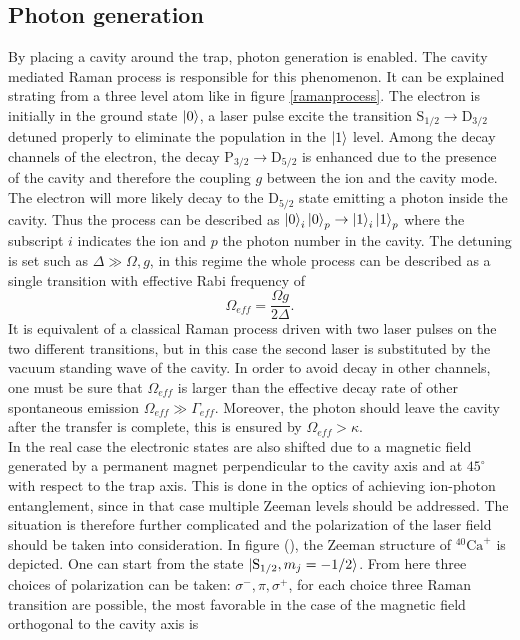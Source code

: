 \subsection{Photon generation}
\label{sec:ramanprocess}
By placing a cavity around the trap, photon generation is enabled. The cavity mediated Raman process is responsible for this phenomenon. It can be explained strating from a three level atom like in figure \ref{ramanprocess}. The electron is initially in the ground state $\ket{0}$, a laser pulse excite the transition $\text{S}_{1/2} \to \text{D}_{3/2}$ detuned properly to eliminate the population in the $\ket{1}$ level. Among the decay channels of the electron, the decay $\text{P}_{3/2} \to \text{D}_{5/2}$ is enhanced due to the presence of the cavity and therefore the coupling $g$ between the ion and the cavity mode. The electron will more likely decay
to the $\text{D}_{5/2}$ state emitting a photon inside the cavity. Thus the process can be described as $\ket{0}_i\ket{0}_p \to \ket{1}_i\ket{1}_p$ where the subscript $i$ indicates the ion and $p$ the photon number in the cavity. The detuning is set such as $\Delta \gg \Omega,g$, in this regime the whole process can be described as a single transition with effective Rabi frequency of \cite{helene}
\begin{equation}
\label{omegaeff}
\Omega_{eff} = \frac{\Omega g}{2\Delta}.
\end{equation}
It is equivalent of a classical Raman process driven with two laser pulses on the two different transitions, but in this case the second laser is substituted by the vacuum standing wave of the cavity. In order to avoid decay in other channels, one must be sure that $\Omega_{eff}$ is larger than the effective decay rate of other spontaneous emission $\Omega_{eff}\gg \Gamma_{eff}$. Moreover, the photon should leave the cavity after the transfer is complete, this is ensured by $\Omega_{eff} >\kappa$.\\
In the real case the electronic states are also shifted due to a magnetic field generated by a permanent magnet perpendicular to the cavity axis and at $45^{\circ}$ with respect to the trap axis. This is done in the optics of achieving ion-photon entanglement, since in that case multiple Zeeman levels should be addressed. The situation is therefore further complicated and the polarization of the laser field should be taken into consideration. In figure (), the Zeeman structure of $^{40}\text{Ca}^+$ is depicted. One can start from the state $\ket{\text{S}_{1/2},m_j = -1/2}$. From here three choices of polarization can be taken: $\sigma^-,\pi,\sigma^+$, for each choice three Raman transition are possible, the most favorable in the case of the magnetic field orthogonal to the cavity axis is \cite{stuteinterface}

